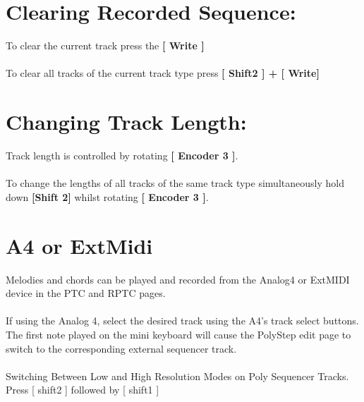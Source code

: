 \section{Clearing Recorded Sequence:}
To clear the current track press the \textbf{[ Write ]}\\
\\To clear all tracks of the current track type press \textbf{[ Shift2 ] + [ Write]}
\section{Changing Track Length:}
Track length is controlled by rotating \textbf{[ Encoder 3 ]}.\\
\\To change the lengths of all tracks of the same track type simultaneously hold down \textbf{[Shift 2] }whilst rotating \textbf{[ Encoder 3 ]}.

\section{A4 or ExtMidi}
Melodies and chords can be played and recorded from the Analog4 or ExtMIDI device in the PTC and RPTC pages.\\
\\
If using the Analog 4, select the desired track using the A4’s track select buttons. The first note played on the mini keyboard will cause the PolyStep edit page to switch to  the corresponding external sequencer track.\\
\\
Switching Between Low and High Resolution Modes on Poly Sequencer Tracks.
Press [ shift2 ] followed by [ shift1 ]


